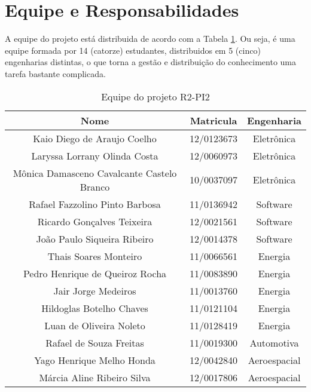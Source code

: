 \section{Equipe e Responsabilidades} %
\label{sub:equipe_e_responsabilidades}

	A equipe do projeto está distribuida de acordo com a Tabela \ref{tab:equipe}. Ou seja, é uma equipe formada por 14 (catorze) estudantes, distribuidos em 5 (cinco) engenharias distintas, o que torna a gestão e distribuição do conhecimento uma tarefa bastante complicada.

	\begin{table}[H]
	\centering
	\caption{Equipe do projeto R2-PI2}
	\label{tab:equipe}
	\begin{tabular}{|c|c|c|}
	\hline
	\textbf{Nome}                              & \textbf{Matricula} & \textbf{Engenharia} \\ \hline
	Kaio Diego de Araujo Coelho                & 12/0123673         & Eletrônica          \\ \hline
	Laryssa Lorrany Olinda Costa               & 12/0060973         & Eletrônica          \\ \hline
	Mônica Damasceno Cavalcante Castelo Branco & 10/0037097         & Eletrônica          \\ \hline
	Rafael Fazzolino Pinto Barbosa             & 11/0136942         & Software            \\ \hline
	Ricardo Gonçalves Teixeira                 & 12/0021561         & Software            \\ \hline
	João Paulo Siqueira Ribeiro                & 12/0014378         & Software            \\ \hline
	Thais Soares Monteiro                      & 11/0066561         & Energia             \\ \hline
	Pedro Henrique de Queiroz Rocha            & 11/0083890         & Energia             \\ \hline
	Jair Jorge Medeiros                        & 11/0013760         & Energia             \\ \hline
	Hildoglas Botelho Chaves                   & 11/0121104         & Energia             \\ \hline
	Luan de Oliveira Noleto                    & 11/0128419         & Energia             \\ \hline
	Rafael de Souza Freitas                    & 11/0019300         & Automotiva          \\ \hline
	Yago Henrique Melho Honda                  & 12/0042840         & Aeroespacial        \\ \hline
	Márcia Aline Ribeiro Silva                 & 12/0017806         & Aeroespacial        \\ \hline
	\end{tabular}
	\end{table}

